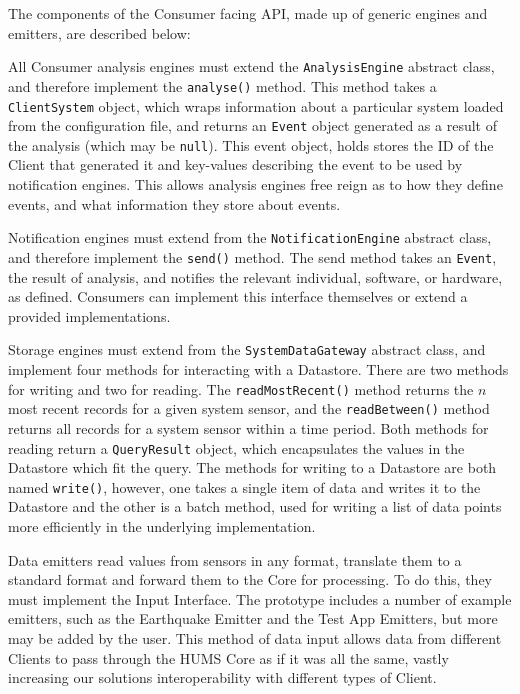 \documentclass[10pt,a4paper]{article}
\begin{document}
The components of the Consumer facing API, made up of generic engines and emitters, are described below:
\begin{description} [noitemsep]	
	\item[Analysis Engines] All Consumer analysis engines must extend the \texttt{AnalysisEngine} abstract class, and therefore implement the \texttt{analyse()} method. This method takes a \texttt{ClientSystem} object, which wraps information about a particular system loaded from the configuration file, and returns an \texttt{Event} object generated as a result of the analysis (which may be \texttt{null}). This event object, holds stores the ID of the Client that generated it and key-values describing the event to be used by notification engines. This allows analysis engines free reign as to how they define events, and what information they store about events.
	\item[Notification Engines] Notification engines must extend from the \texttt{NotificationEngine} abstract class, and therefore implement the \texttt{send()} method. The send method takes an \texttt{Event}, the result of analysis, and notifies the relevant individual, software, or hardware, as defined. Consumers can implement this interface themselves or extend a provided implementations.
	\item[Storage Engines] Storage engines must extend from the \texttt{SystemDataGateway} abstract class, and implement four methods for interacting with a Datastore. There are two methods for writing and two for reading. The \texttt{readMostRecent()} method returns the $n$ most recent records for a given system sensor, and the \texttt{readBetween()} method returns all records for a system sensor within a time period. Both methods for reading return a \texttt{QueryResult} object, which encapsulates the values in the Datastore which fit the query. The methods for writing to a Datastore are both named \texttt{write()}, however, one takes a single item of data and writes it to the Datastore and the other is a batch method, used for writing a list of data points more efficiently in the underlying implementation. 
	\item[Data Emitters] Data emitters read values from sensors in any format, translate them to a standard format and forward them to the Core for processing. To do this, they must implement the Input Interface. The prototype includes a number of example emitters, such as the Earthquake Emitter and the Test App Emitters, but more may be added by the user. This method of data input allows data from different Clients to pass through the HUMS Core as if it was all the same, vastly increasing our solutions interoperability with different types of Client.
\end{description}
\end{document}
